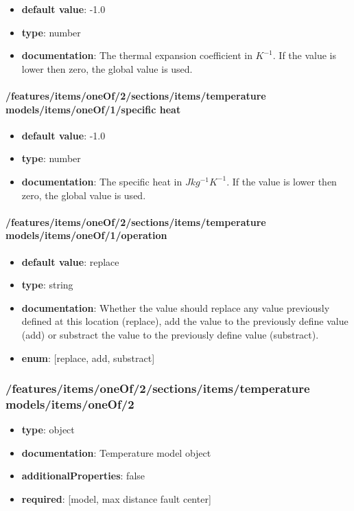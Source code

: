 \begin{itemize}\item {\bf default value}: -1.0
\item {\bf type}: number
\item {\bf documentation}: The thermal expansion coefficient in $K^{-1}$. If the value is lower then zero, the global value is used.
\end{itemize}\paragraph{/features/items/oneOf/2/sections/items/temperature models/items/oneOf/1/specific heat}
\begin{itemize}\item {\bf default value}: -1.0
\item {\bf type}: number
\item {\bf documentation}: The specific heat in $J kg^{-1} K^{-1}$. If the value is lower then zero, the global value is used.
\end{itemize}\paragraph{/features/items/oneOf/2/sections/items/temperature models/items/oneOf/1/operation}
\begin{itemize}\item {\bf default value}: replace
\item {\bf type}: string
\item {\bf documentation}: Whether the value should replace any value previously defined at this location (replace), add the value to the previously define value (add) or substract the value to the previously define value (substract).
\item {\bf enum}: [replace, add, substract]\end{itemize}\subsubsection{/features/items/oneOf/2/sections/items/temperature models/items/oneOf/2}
\begin{itemize}\item {\bf type}: object
\item {\bf documentation}: Temperature model object
\item {\bf additionalProperties}: false
\item {\bf required}: [model, max distance fault center]\end{itemize}

